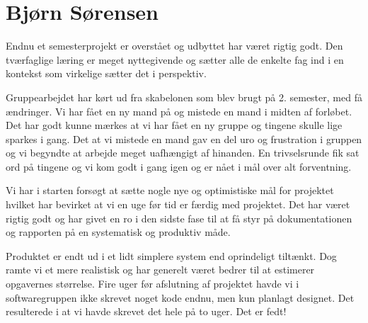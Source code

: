 \section{Bjørn Sørensen}

Endnu et semesterprojekt er overstået og udbyttet har været rigtig godt. Den tværfaglige læring er meget nyttegivende og sætter alle de enkelte fag ind i en kontekst som virkelige sætter det i perspektiv.

Gruppearbejdet har kørt ud fra skabelonen som blev brugt på 2. semester, med få ændringer. Vi har fået en ny mand på og mistede en mand i midten af forløbet. Det har godt kunne mærkes at vi har fået en ny gruppe og tingene skulle lige sparkes i gang. 
Det at vi mistede en mand gav en del uro og frustration i gruppen og vi begyndte at arbejde meget uafhængigt af hinanden. En trivselsrunde fik sat ord på tingene og vi kom godt i gang igen og er nået i mål over alt forventning.

Vi har i starten forsøgt at sætte nogle nye og optimistiske mål for projektet hvilket har bevirket at vi en uge før tid er færdig med projektet. Det har været rigtig godt og har givet en ro i den sidste fase til at få styr på dokumentationen og rapporten på en systematisk og produktiv måde.

Produktet er endt ud i et lidt simplere system end oprindeligt tiltænkt. Dog ramte vi et mere realistisk og har generelt været bedrer til at estimerer opgavernes størrelse. Fire uger før afslutning af projektet havde vi i softwaregruppen ikke skrevet noget kode endnu, men kun planlagt designet. Det resulterede i at vi havde skrevet det hele på to uger. Det er fedt!